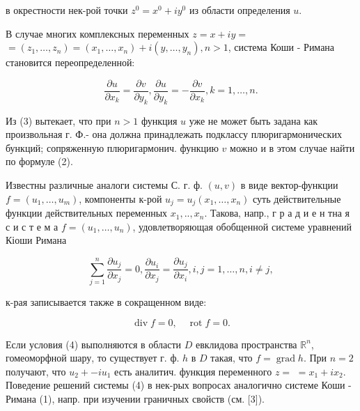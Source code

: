 \documentclass[10pt]{article}
\begin{document}
в окрестности нек-рой точки $z^{0}=x^{0}+i y^{0}$ из области определения $u$.



В случае многих комплексных переменных $z=x+i y=$ $=\left(z_{1}, \ldots, z_{n}\right)=\left(x_{1}, \ldots, x_{n}\right)+i\left(y, \ldots, y_{n}\right), n>1$, система Коши - Римана становится переопределенной:



\[

\frac{\partial u}{\partial x_{k}}=\frac{\partial v}{\partial y_{k}}, \frac{\partial u}{\partial y_{k}}=-\frac{\partial v}{\partial x_{k}}, k=1, \ldots, n .

\]



Из (3) вытекает, что при $n>1$ функция $u$ уже не может быть задана как произвольная г. Ф.- она должна принадлежать подклассу плюригармонических бункций; сопряженную плюригармонич. функцию $v$ можно и в этом случае найти по формуле (2).



Известны различные аналоги системы С. г. ф. $(u, v)$ в виде вектор-функции $f=\left(u_{1}, \ldots, u_{m}\right)$, компоненты к-рой $u_{j}=u_{j}\left(x_{1}, \ldots, x_{n}\right)$ суть действительные функции действительных переменных $x_{1}, . ., x_{n}$. Такова, напр., г р а д и е н тна я с и с т е м а $f=\left(u_{1}, \ldots, u_{n}\right)$, удовлетворяющая обобщенной системе уравнений Кіоши Римана



\[

\sum_{j=1}^{n} \frac{\partial u_{j}}{\partial x_{j}}=0, \frac{\partial u_{i}}{\partial x_{j}}=\frac{\partial u_{j}}{\partial x_{i}}, i, j=1, \ldots, n, i \neq j,

\]



к-рая записывается также в сокращенном виде:



\[

\operatorname{div} f=0, \quad \operatorname{rot} f=0 .

\]



Если условия (4) выполняются в области $D$ евклидова пространства $\mathbb{R}^{n}$, гомеоморфной шару, то существует г. ф. $h$ в $D$ такая, что $f=\operatorname{grad} h$. При $n=2$ получают, что $u_{2}+-i u_{1}$ есть аналитич. функция переменного $z=$ $=x_{1}+i x_{2}$. Поведение решений системы (4) в нек-рых вопросах аналогично системе Коши - Римана (1), напр. при изучении граничных свойств (см. [3]).
\end{document}
